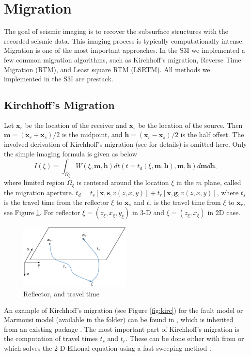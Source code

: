\documentclass[11pt,titlepage]{article}
\newcommand{\bx}{\boldsymbol{x}}
\newcommand{\bg}{\boldsymbol{g}}
\newcommand{\bh}{\boldsymbol{h}}
\newcommand{\bs}{\boldsymbol{s}}
\newcommand{\bm}{\boldsymbol{m}}
\theoremstyle{plain}
\theoremstyle{definition}
\theoremstyle{remark}
\numberwithin{equation}{section}
\begin{document}
\section{Migration}
The goal of seismic imaging is to recover the subsurface structures with the recorded seismic data. This imaging process is typically computationally intense. Migration is one of the most important approaches. In the S3I we implemented a few common migration algorithms, such as Kirchhoff's migration, Reverse Time Migration (RTM), and Least square RTM (LSRTM). All methods we implemented in the S3I are prestack.  


\subsection{Kirchhoff's Migration}
Let $\bx_r$ be the location of the receiver and $\bx_s$ be the location of the source. Then $\bm=(\bx_r+\bx_s)/2$ is the midpoint, and $\bh=(\bx_r-\bx_s)/2$ is the half offset. The involved derivation of Kirchhoff's migration (see \cite{Schneider:1978aa} for details) is omitted here. Only the simple imaging formula is given as below
\begin{equation}
\label{eq:kirchhoffImaging}
I(\xi)=\int_{\Omega_\xi} W(\xi,\bm,\bh)dt(t=t_d(\xi,
\bm,\bh),\bm,\bh)d\bm d\bh,
\end{equation}
where limited region $\Omega_\xi$ is centered around the location $\xi$ in the $m$ plane, called the migration aperture. $t_d=t_s[\bx,\bs,v(z,x,y)]+t_r[\bx,\bg,v(z,x,y)]$, where $t_s$ is the travel time from the reflector $\xi$ to $\bx_s$ and $t_r$ is the travel time from $\xi$ to $\bx_r$, see Figure \ref{fig:ref}. For reflector $\xi = (z_\xi, x_\xi, y_\xi)$ in 3-D and $\xi = (z_\xi, x_\xi)$ in 2D case.

\begin{figure}[htbp]
\centering
\includegraphics[width=0.5\textwidth]{Fig/tstr}
\caption{Reflector, and travel time}
\label{fig:ref}
\end{figure}
  
An example of Kirchhoff's migration (see Figure \ref{fig:kirc}) for the fault model or Marmousi model (available in the  folder) can be found in , which is inherited from an existing package \cite{Kozola:2011aa}. The most important part of Kirchhoff's migration is the computation of travel times $t_s$ and $t_r$. These can be done either with  from \cite{Kozola:2011aa} or  which solves the 2-D Eikonal equation using a fast sweeping method \cite{Zhao:2004aa}.
\end{document}
